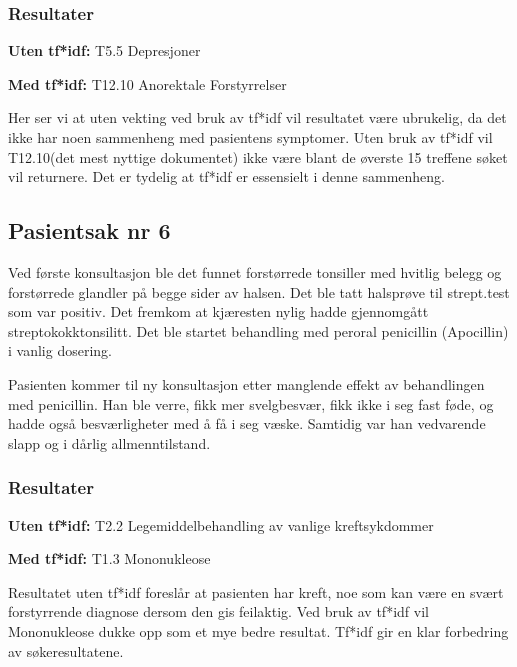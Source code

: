 \subsubsection{Resultater}
\begin{description}
\item{\textbf{Uten tf*idf: }}T5.5 Depresjoner
\item{\textbf{Med tf*idf: }}T12.10 Anorektale Forstyrrelser
\end{description}

Her ser vi at uten vekting ved bruk av tf*idf vil resultatet være ubrukelig, da det ikke har noen sammenheng med pasientens symptomer. Uten bruk av tf*idf vil T12.10(det mest nyttige dokumentet) ikke være blant de øverste 15 treffene søket vil returnere. Det er tydelig at tf*idf er essensielt i denne sammenheng.


\subsection{Pasientsak nr 6}
Ved første konsultasjon ble det funnet forstørrede tonsiller med hvitlig belegg og forstørrede glandler på begge sider av halsen. Det ble tatt halsprøve til strept.test som var positiv. Det fremkom at kjæresten nylig hadde gjennomgått streptokokktonsilitt. Det ble startet behandling med peroral penicillin (Apocillin) i vanlig dosering.

Pasienten kommer til ny konsultasjon etter manglende effekt av behandlingen med penicillin. Han ble verre, fikk mer svelgbesvær, fikk ikke i seg fast føde, og hadde også besværligheter med å få i seg væske. Samtidig var han vedvarende slapp og i dårlig allmenntilstand.

\subsubsection{Resultater}
\begin{description}
\item{\textbf{Uten tf*idf: }} T2.2 Legemiddelbehandling av vanlige kreftsykdommer
\item{\textbf{Med tf*idf: }} T1.3 Mononukleose
\end{description}
Resultatet uten tf*idf foreslår at pasienten har kreft, noe som kan være en svært forstyrrende diagnose dersom den gis feilaktig. Ved bruk av tf*idf vil Mononukleose dukke opp som et mye bedre resultat. Tf*idf gir en klar forbedring av søkeresultatene. 

